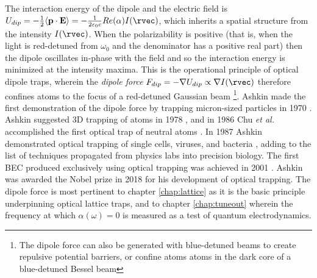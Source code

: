 	The interaction energy of the dipole and the electric field is $U_{dip} = -\frac{1}{2}\langle\textbf{p}\cdot\textbf{E}\rangle = -\frac{1}{2\varepsilon_0 c}Re(\alpha)I(\rvec)$, which inherits a spatial structure from the intensity $I(\rvec)$.
	When the polarizability is positive (that is, when the light is red-detuned from $\omega_0$ and the denominator has a positive real part) then the dipole oscillates in-phase with the field and so the interaction energy is minimized at the intensity maxima.
	This is the operational principle of optical dipole traps, wherein the \emph{dipole force} $F_{dip} = -\nabla U_{dip} \propto \nabla I(\rvec)$ therefore confines atoms to the focus of a red-detuned Gaussian beam \footnote{The dipole force can also be generated with blue-detuned beams to create repulsive potential barriers, or confine atoms atoms in the dark core of a blue-detuned Bessel beam}.
	Ashkin made the first demonstration of the dipole force by trapping micron-sized particles in 1970 \cite{Ashkin70}.
	Ashkin suggested 3D trapping of atoms in 1978 \cite{Ashkin78}, and in 1986 Chu \emph{et al.} accomplished the first optical trap of neutral atoms \cite{Chu86}. 
	In 1987 Ashkin demonstrated optical trapping of single cells, viruses, and bacteria \cite{Ashkin87cell, ashkin87virus}, adding to the list of techniques propagated from physics labs into precision biology.
	The first BEC produced exclusively using optical trapping was achieved in 2001 \cite{Barrett01}.
	Ashkin was awarded the Nobel prize in 2018 for his development of optical trapping.
	The dipole force is most pertinent to chapter \ref{chap:lattice} as it is the basic principle underpinning optical lattice traps, and to chapter \ref{chap:tuneout} wherein the frequency at which $\alpha(\omega)=0$ is measured as a test of quantum electrodynamics.
	


